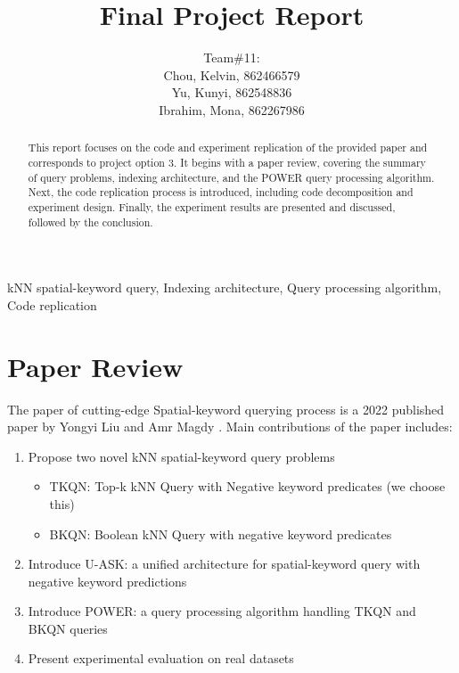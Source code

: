 \documentclass[]{IEEEphot}
\begin{document}
\title{Final Project Report}

\author{Team\#11:\\
    Chou, Kelvin, 862466579\\
    Yu, Kunyi, 862548836\\
    Ibrahim, Mona, 862267986}

\maketitle


\begin{abstract}
    This report focuses on the code and experiment replication of the provided paper \cite{ref1-original-paper} and corresponds to project option 3. It begins with a paper review, covering the summary of query problems, indexing architecture, and the POWER query processing algorithm. Next, the code replication process is introduced, including code decomposition and experiment design. Finally, the experiment results are presented and discussed, followed by the conclusion.
\end{abstract}

\begin{IEEEkeywords}
    kNN spatial-keyword query, Indexing architecture, Query processing algorithm, Code replication
\end{IEEEkeywords}

\section{Paper Review}

The paper of cutting-edge Spatial-keyword querying process is a 2022 published paper by Yongyi Liu and Amr Magdy \cite{ref1-original-paper}. Main contributions of the paper includes:

\begin{enumerate}
    \item Propose two novel kNN spatial-keyword query problems
    \begin{itemize}
        \item TKQN: Top-k kNN Query with Negative keyword predicates (we choose this)
        \item BKQN: Boolean kNN Query with negative keyword predicates
    \end{itemize}
    \item Introduce U-ASK: a unified architecture for spatial-keyword query with negative keyword predictions
    \item Introduce POWER: a query processing algorithm handling TKQN and BKQN queries
    \item Present experimental evaluation on real datasets
\end{enumerate}
\end{document}
